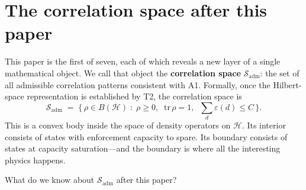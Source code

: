 \documentclass[11pt]{article}
\begin{document}
\section{The correlation space after this paper}
\label{sec:corr_space}

This paper is the first of seven, each of which reveals a new layer of a single mathematical object.  We call that object the \textbf{correlation space} $\mathcal{S}_{\mathrm{adm}}$: the set of all admissible correlation patterns consistent with A1.  Formally, once the Hilbert-space representation is established by T2, the correlation space is
\begin{equation}
\mathcal{S}_{\mathrm{adm}} \;=\; \bigl\{\, \rho \in B(\mathcal{H}) \;:\; \rho \ge 0,\;\; \mathrm{tr}\,\rho = 1,\;\; \textstyle\sum_{d} \varepsilon(d) \le C \,\bigr\}.
\end{equation}
This is a convex body inside the space of density operators on $\mathcal{H}$.  Its interior consists of states with enforcement capacity to spare.  Its boundary consists of states at capacity saturation---and the boundary is where all the interesting physics happens.

What do we know about $\mathcal{S}_{\mathrm{adm}}$ after this paper?
\end{document}
